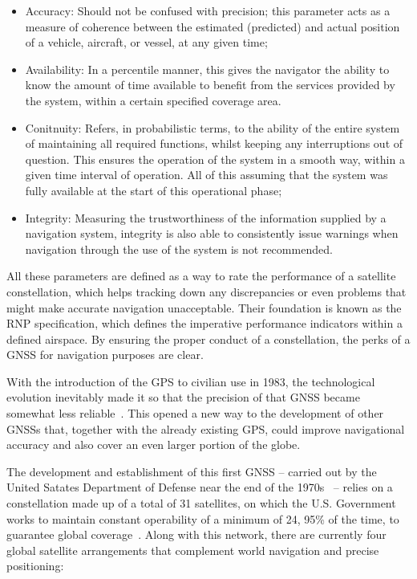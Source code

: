 \begin{itemize}
    \item Accuracy: Should not be confused with precision; this parameter acts as a measure of coherence between the estimated (predicted) and actual position of a vehicle, aircraft, or vessel, at any given time;
    \item Availability: In a percentile manner, this gives the navigator the ability to know the amount of time available to benefit from the services provided by the system, within a certain specified coverage area.
    \item Conitnuity: Refers, in probabilistic terms, to the ability of the entire system of maintaining all required functions, whilst keeping any interruptions out of question. This ensures the operation of the system in a smooth way, within a given time interval of operation. All of this assuming that the system was fully available at the start of this operational phase;
    \item Integrity: Measuring the trustworthiness of the information supplied by a navigation system, integrity is also able to consistently issue warnings when navigation through the use of the system is not recommended.
\end{itemize}
All these parameters are defined as a way to rate the performance of a satellite constellation, which helps tracking down any discrepancies or even problems that might make accurate navigation unacceptable.
Their foundation is known as the RNP specification, which defines the imperative performance indicators within a defined airspace. By ensuring the proper conduct of a constellation, the perks of a GNSS for navigation purposes are clear.

With the introduction of the GPS to civilian use in 1983, the technological evolution inevitably made it so that the precision of that GNSS became somewhat less reliable~\cite{novatel_gnss}. This opened a new way to the development of other GNSSs that, together with the already existing GPS, could improve navigational accuracy and also cover an even larger portion of the globe.

The development and establishment of this first GNSS -- carried out by the United Satates Department of Defense near the end of the 1970s~\cite{novatel_gnss} -- relies on a constellation made up of a total of 31 satellites, on which the U.S. Government works to maintain constant operability of a minimum of 24, 95\% of the time, to guarantee global coverage~\cite{gps_USGov}. Along with this network, there are currently four global satellite arrangements that complement world navigation and precise positioning:

